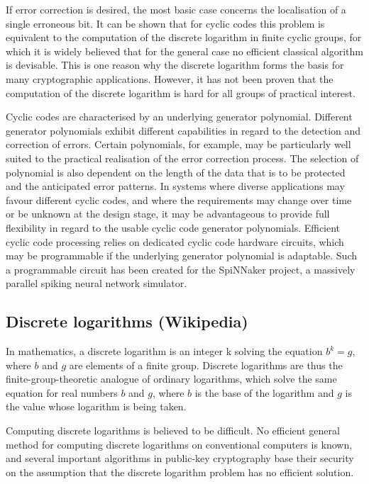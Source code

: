 \documentclass[a4paper, 11pt]{article}
\begin{document}
If error correction is desired, the most basic case concerns the localisation of a single erroneous bit. It can be shown that for cyclic codes this problem is equivalent to the computation of the discrete logarithm in finite cyclic groups, for which it is widely believed that for the general case no efficient classical algorithm is devisable. This is one reason why the discrete logarithm forms the basis for many cryptographic applications. However, it has not been proven that the computation of the discrete logarithm is hard for all groups of practical interest.

Cyclic codes are characterised by an underlying generator polynomial. Different generator polynomials exhibit different capabilities in regard to the detection and correction of errors. Certain polynomials, for example, may be particularly well suited to the practical realisation of the error correction process. The selection of polynomial is also dependent on the length of the data that is to be protected and the anticipated error patterns. In systems where diverse applications may favour different cyclic codes, and where the requirements may change over time or be unknown at the design stage, it may be advantageous to provide full flexibility in regard to the usable cyclic code generator polynomials. Efficient cyclic code processing relies on dedicated cyclic code hardware circuits, which may be programmable if the underlying generator polynomial is adaptable. Such a programmable circuit has been created for the SpiNNaker project, a massively parallel spiking neural network simulator.

\subsection{Discrete logarithms (Wikipedia)}
In mathematics, a discrete logarithm is an integer k solving the equation $b^k = g$, where $b$ and $g$ are elements of a finite group. Discrete logarithms are thus the finite-group-theoretic analogue of ordinary logarithms, which solve the same equation for real numbers $b$ and $g$, where $b$ is the base of the logarithm and $g$ is the value whose logarithm is being taken.

Computing discrete logarithms is believed to be difficult. No efficient general method for computing discrete logarithms on conventional computers is known, and several important algorithms in public-key cryptography base their security on the assumption that the discrete logarithm problem has no efficient solution.
\end{document}
